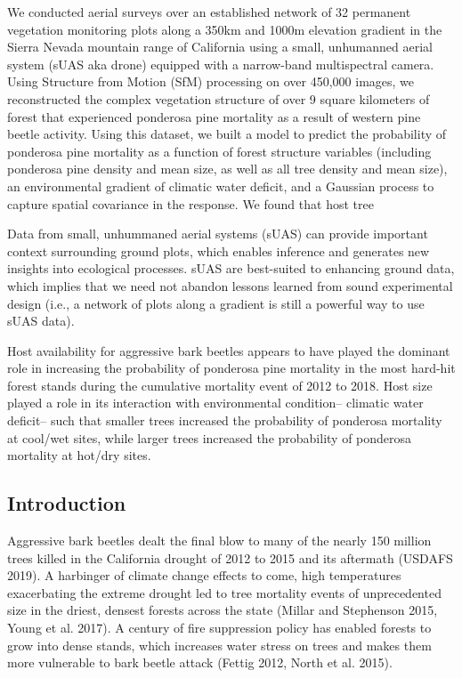 \documentclass[]{article}
\begin{document}
We conducted aerial surveys over an established network of 32 permanent
vegetation monitoring plots along a 350km and 1000m elevation gradient
in the Sierra Nevada mountain range of California using a small,
unhumanned aerial system (sUAS aka drone) equipped with a narrow-band
multispectral camera. Using Structure from Motion (SfM) processing on
over 450,000 images, we reconstructed the complex vegetation structure
of over 9 square kilometers of forest that experienced ponderosa pine
mortality as a result of western pine beetle activity. Using this
dataset, we built a model to predict the probability of ponderosa pine
mortality as a function of forest structure variables (including
ponderosa pine density and mean size, as well as all tree density and
mean size), an environmental gradient of climatic water deficit, and a
Gaussian process to capture spatial covariance in the response. We found
that host tree

Data from small, unhummaned aerial systems (sUAS) can provide important
context surrounding ground plots, which enables inference and generates
new insights into ecological processes. sUAS are best-suited to
enhancing ground data, which implies that we need not abandon lessons
learned from sound experimental design (i.e., a network of plots along a
gradient is still a powerful way to use sUAS data).

Host availability for aggressive bark beetles appears to have played the
dominant role in increasing the probability of ponderosa pine mortality
in the most hard-hit forest stands during the cumulative mortality event
of 2012 to 2018. Host size played a role in its interaction with
environmental condition-- climatic water deficit-- such that smaller
trees increased the probability of ponderosa mortality at cool/wet
sites, while larger trees increased the probability of ponderosa
mortality at hot/dry sites.

\subsection{Introduction}\label{introduction}

Aggressive bark beetles dealt the final blow to many of the nearly 150
million trees killed in the California drought of 2012 to 2015 and its
aftermath (USDAFS 2019). A harbinger of climate change effects to come,
high temperatures exacerbating the extreme drought led to tree mortality
events of unprecedented size in the driest, densest forests across the
state (Millar and Stephenson 2015, Young et al. 2017). A century of fire
suppression policy has enabled forests to grow into dense stands, which
increases water stress on trees and makes them more vulnerable to bark
beetle attack (Fettig 2012, North et al. 2015).
\end{document}
